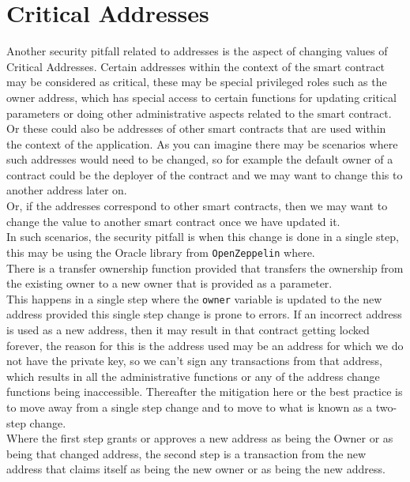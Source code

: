 \section{Critical Addresses}

Another security pitfall related to addresses is the aspect of changing values of Critical Addresses. Certain addresses within the context of the smart contract may be considered as critical, these may be special privileged roles such as the owner address, which has special access to certain functions for updating critical parameters or doing other administrative aspects related to the smart contract.\\

Or these could also be addresses of other smart contracts that are used within the context of the application. As you can imagine there may be scenarios where such addresses would need to be changed, so for example the default owner of a contract could be the deployer of the contract and we may want to change this to another address later on. \\

Or, if the addresses correspond to other smart contracts, then we may want to change the value to another smart contract once we have updated it.\\

In such scenarios, the security pitfall is when this change is done in a single step, this may be using the Oracle library from \texttt{OpenZeppelin} where.\\

There is a transfer ownership function provided that transfers the ownership from the existing owner to a new owner that is provided as a parameter.\\

This happens in a single step where the \texttt{owner} variable is updated to the new address provided this single step change is prone to errors. If an incorrect address is used as a new address, then it may result in that contract getting locked forever, the reason for this is the address used may be an address for which we do not have the private key, so we can't sign any transactions from that address, which results in all the administrative functions or any of the address change functions being inaccessible. Thereafter the mitigation here or the best practice is to move away from a single step change and to move to what is known as a two-step change.\\

Where the first step grants or approves a new address as being the Owner or as being that changed address, the second step is a transaction from the new address that claims itself as being the new owner or as being the new address. \\

